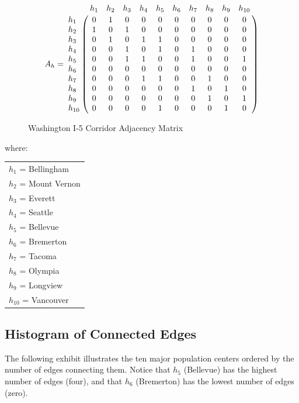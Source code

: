 \documentclass{article}
\begin{document}
    \begin{figure}[h]
    \begin{equation} \nonumber
        A_h = \bordermatrix{
                 & h_1 & h_2 & h_3 & h_4 & h_5 & h_6 & h_7 & h_8 & h_9 & h_{10} \cr
             h_1 &   0   & 1   & 0   & 0   & 0   & 0   & 0   & 0   & 0   & 0    \cr
             h_2 &   1   & 0   & 1   & 0   & 0   & 0   & 0   & 0   & 0   & 0    \cr
             h_3 &   0   & 1   & 0   & 1   & 1   & 0   & 0   & 0   & 0   & 0    \cr
             h_4 &   0   & 0   & 1   & 0   & 1   & 0   & 1   & 0   & 0   & 0    \cr
             h_5 &   0   & 0   & 1   & 1   & 0   & 0   & 1   & 0   & 0   & 1    \cr
             h_6 &   0   & 0   & 0   & 0   & 0   & 0   & 0   & 0   & 0   & 0    \cr
             h_7 &   0   & 0   & 0   & 1   & 1   & 0   & 0   & 1   & 0   & 0    \cr
             h_8 &   0   & 0   & 0   & 0   & 0   & 0   & 1   & 0   & 1   & 0    \cr
             h_9 &   0   & 0   & 0   & 0   & 0   & 0   & 0   & 1   & 0   & 1    \cr
             h_{10} & 0   & 0   & 0   & 0   & 1   & 0   & 0   & 0   & 1   & 0   \cr
        }
    \end{equation}
    \caption{Washington I-5 Corridor Adjacency Matrix}
    \label{fig:matrix}
    \end{figure}
    
\newpage
where:
    \begin{center}
    \begin{tabular}{l}
        $h_1$ = Bellingham\\
        $h_2$ = Mount Vernon\\
        $h_3$ = Everett\\
        $h_4$ = Seattle\\
        $h_5$ = Bellevue\\
        $h_6$ = Bremerton\\
        $h_7$ = Tacoma\\
        $h_8$ = Olympia\\
        $h_9$ = Longview\\
        $h_{10}$ = Vancouver
    \end{tabular}
    \end{center}

\subsection*{Histogram of Connected Edges}
The following exhibit illustrates the ten major population centers ordered by the number of edges connecting them. Notice that $h_5$ (Bellevue) has the highest number of edges (four), and that $h_6$ (Bremerton) has the lowest number of edges (zero).
\end{document}
